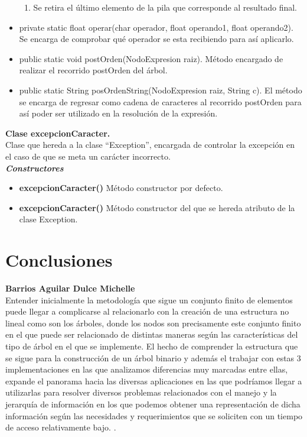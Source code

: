 \documentclass{article}
\begin{document}
\begin{itemize}
\begin{enumerate}
\item Se retira el último elemento de la pila que corresponde al resultado final.
\end{enumerate}
\item private  static float operar(char operador, float operando1, float operando2). Se encarga de comprobar qué operador se esta recibiendo para así aplicarlo.
\item public static void postOrden(NodoExpresion raiz). Método encargado de realizar el recorrido postOrden del árbol.
\item public  static String posOrdenString(NodoExpresion raiz, String c). El método se encarga de regresar como cadena de caracteres al recorrido postOrden para así poder ser utilizado en la resolución de la expresión.
\end{itemize}

\textbf{Clase excepcionCaracter.}\\

Clase que hereda a la clase “Exception”, encargada de controlar la excepción en el caso de que se meta un carácter incorrecto.\\

\vspace{5mm} %
\textit{\textbf{Constructores}}
\begin{itemize}
\item \textbf{excepcionCaracter()} Método constructor por defecto.
\item \textbf{excepcionCaracter()} Método constructor del que se hereda atributo de la clase Exception. 
\end{itemize}
\newpage
\section{Conclusiones}

\textbf{Barrios Aguilar Dulce Michelle}\\

Entender inicialmente la metodología que sigue un conjunto finito de elementos puede llegar a complicarse al relacionarlo con la creación de una estructura no lineal como son los árboles, donde los nodos son precisamente este conjunto finito en el que puede ser relacionado de distintas maneras según las características del tipo de árbol en el que se implemente. 
El hecho de comprender la estructura que se sigue para la construcción de un árbol binario y además el trabajar con estas 3 implementaciones en las que analizamos diferencias muy marcadas entre ellas, expande el panorama hacia las diversas aplicaciones en las que podríamos llegar a utilizarlas para resolver diversos problemas relacionados con el manejo y la jerarquía de información en los que podemos obtener una representación de dicha información según las necesidades y requerimientos que se soliciten con un tiempo de acceso relativamente bajo. . \\
\end{document}
